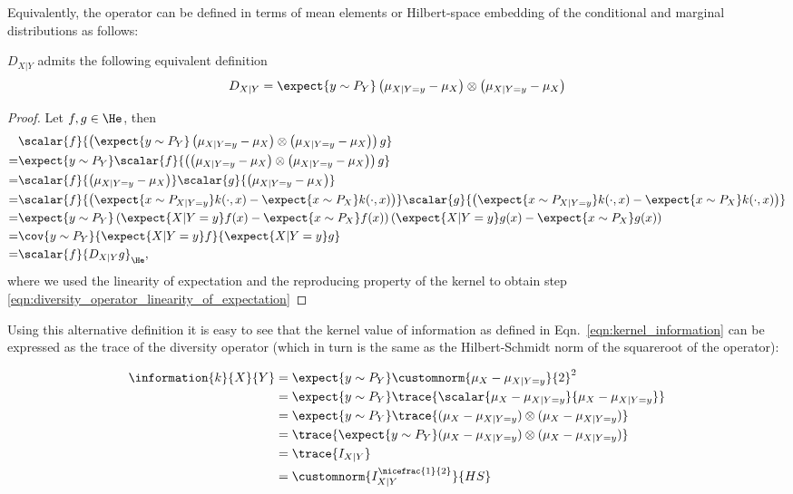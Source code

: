 Equivalently, the operator can be defined in terms of mean elements or Hilbert-space embedding of the conditional and marginal distributions as follows:

\begin{statement}
$D_{X\vert Y}$ admits the following equivalent definition
\begin{align}
	D_{X\vert Y} = \expect{y\sim P_Y} \left(\mu_{X\vert Y=y} - \mu_{X}\right) \otimes \left(\mu_{X\vert Y=y}  - \mu_{X} \right)
\end{align}

\begin{proof}
Let $f,g\in\He$, then
\begin{align}
	&\scalar{f}{ \left(\expect{y\sim P_Y}\left(\mu_{X\vert Y=y} - \mu_{X}\right) \otimes \left(\mu_{X\vert Y=y}  - \mu_{X} \right)\right) g}\\
	=&\expect{y\sim P_Y}\scalar{f}{ \left(\left(\mu_{X\vert Y=y} - \mu_{X}\right) \otimes \left(\mu_{X\vert Y=y}  - \mu_{X} \right)\right) g}\\
	=& \scalar{f}{\left(\mu_{X\vert Y=y} - \mu_{X}\right)}\scalar{g}{\left(\mu_{X\vert Y=y} - \mu_{X}\right)}\\
	=& \scalar{f}{\left(\expect{x\sim P_{X\vert Y=y}}k(\cdot,x) - \expect{x\sim P_X}k(\cdot,x)\right)}\scalar{g}{\left(\expect{x\sim P_{X\vert Y=y}}k(\cdot,x) - \expect{x\sim P_X}k(\cdot,x)\right)}\\
	=& \expect{y\sim P_Y} \left(\expect{X\vert Y=y} f(x) - \expect{x\sim P_X}f(x)\right)\left(\expect{X\vert Y=y} g(x) - \expect{x\sim P_X}g(x)\right)\label{eqn:diversity_operator_linearity_of_expectation}\\
	=& \cov{y\sim P_Y}{\expect{X\vert Y=y} f}{\expect{X\vert Y=y} g}\\
	=& \scalar{f}{D_{X\vert Y}g}_{\He},
\end{align}
where we used the linearity of expectation and the reproducing property of the kernel to obtain step \eqref{eqn:diversity_operator_linearity_of_expectation}
\end{proof}
\end{statement}

Using this alternative definition it is easy to see that the kernel value of information as defined in Eqn.\ \eqref{eqn:kernel_information} can be expressed as the trace of the diversity operator (which in turn is the same as the Hilbert-Schmidt norm of the squareroot of the operator):

\begin{align}
	\information{k}{X}{Y} &= \expect{y \sim P_{Y}} \customnorm{\mu_X - \mu_{X\vert Y=y}}{2}^2\\
		&= \expect{y \sim P_{Y}} \trace{\scalar{\mu_X - \mu_{X\vert Y=y}}{\mu_X - \mu_{X\vert Y=y}}}\\
		&= \expect{y \sim P_{Y}} \trace{ ( \mu_X - \mu_{X\vert Y=y}) \otimes (\mu_X - \mu_{X\vert Y=y})}\\
		&= \trace{ \expect{y \sim P_{Y}} ( \mu_X - \mu_{X\vert Y=y}) \otimes (\mu_X - \mu_{X\vert Y=y})} \\
		&= \trace{I_{X\vert Y}}\\
		&= \customnorm{I_{X\vert Y}^{\nicefrac{1}{2}}}{HS}
\end{align}

